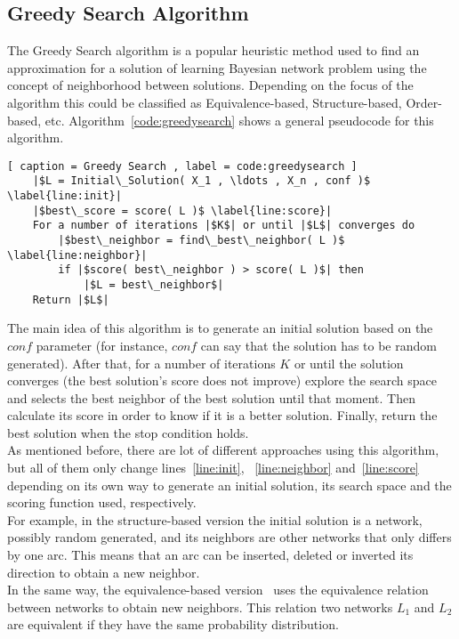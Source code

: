 \subsection{Greedy Search Algorithm}
\label{subsec:greedysearch}

The Greedy Search algorithm is a popular heuristic method used to find an approximation for a solution of  learning Bayesian network problem using the concept of neighborhood between solutions. Depending on the focus of the algorithm this could be classified as Equivalence-based, Structure-based, Order-based, etc. Algorithm~\ref{code:greedysearch} shows a general pseudocode for this algorithm.

\begin{lstlisting}[ caption = Greedy Search , label = code:greedysearch ]
	|$L = Initial\_Solution( X_1 , \ldots , X_n , conf )$ \label{line:init}|
	|$best\_score = score( L )$ \label{line:score}|
	For a number of iterations |$K$| or until |$L$| converges do
		|$best\_neighbor = find\_best\_neighbor( L )$ \label{line:neighbor}|
		if |$score( best\_neighbor ) > score( L )$| then
			|$L = best\_neighbor$|
	Return |$L$|
\end{lstlisting}
The main idea of this algorithm is to generate an initial solution based on the ${conf}$ parameter (for instance, ${conf}$ can say that the solution has to be random generated). After that, for a number of iterations $K$ or until the solution converges (the best solution's score does not improve) explore the search space and selects the best neighbor of the best solution until that moment. Then calculate its score in order to know if it is a better solution. Finally, return the best solution when the stop condition holds.\\
As mentioned before, there are lot of different approaches using this algorithm, but all of them only change lines~\ref{line:init}, ~\ref{line:neighbor} and~\ref{line:score} depending on its own way to generate an initial solution, its search space and the scoring function used, respectively.\\
For example, in the structure-based version the initial solution is a network, possibly random generated, and its neighbors are other networks that only differs by one arc. This means that an arc can be inserted, deleted or inverted its direction to obtain a new neighbor.\\
In the same way, the equivalence-based version~\cite{Maxwell04} uses the equivalence relation between networks to obtain new neighbors. This relation two networks $L_1$ and $L_2$ are equivalent if they have the same probability distribution.

